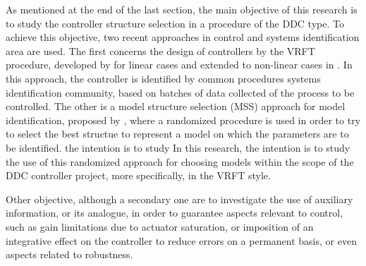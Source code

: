 As mentioned at the end of the last section, the main objective of this research is to study the controller structure selection in a procedure of the DDC type. To achieve this objective, two recent approaches in control and systems identification area are used.
The first concerns the design of controllers by the VRFT procedure, developed by \cite{campi2002} for linear cases and extended to non-linear cases in \cite{campi2006}. In this approach, the controller is identified by common procedures systems identification community, based on batches of data collected of the process to be controlled.
The other is a model structure selection (MSS) approach for model identification, proposed by \cite{falsone2014}, where a randomized procedure is used in order to try to select the best structue to represent a model on which the parameters are to be identified.
the intention is to study
In this research, the intention is to study the use of this randomized approach for choosing models within the scope of the DDC controller project, more specifically, in the VRFT style.

Other objective, although a secondary one are to investigate the use of auxiliary information, or its analogue, in order to guarantee aspects relevant to control, such as gain limitations due to actuator saturation, or imposition of an integrative effect on the controller to reduce errors on a permanent basis, or even aspects related to robustness.  

